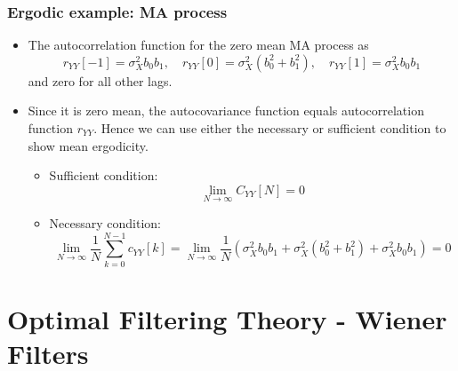\documentclass[12pt]{article}
\newcommand{\sigd}{\sigma^2}
\begin{document}
\subsubsection{Ergodic example: MA process}
\begin{itemize}
    \item The autocorrelation function for the zero mean MA process as 
    \[
    r_{YY}[-1] = \sigd_X b_0 b_1,\quad r_{YY}[0] =\sigd_X (b_0^2 + b_1^2), \quad r_{YY}[1] = \sigd_X b_0 b_1
    \]
    and zero for all other lags.
    \item Since it is zero mean, the autocovariance function equals autocorrelation function $r_{YY}$. Hence we can use either the necessary or sufficient condition to show mean ergodicity.
    \begin{itemize}
        \item Sufficient condition:
        \[
        \lim_{N\rightarrow \infty}C_{YY}[N] = 0
        \]
        \item Necessary condition:
        \[
        \lim_{N\rightarrow \infty}  \frac{1}{N} \sum_{k=0}^{N-1}c_{YY}[k] = \lim_{N\rightarrow \infty}  \frac{1}{N}(\sigd_Xb_0 b_1 + \sigd_X(b_0^2 + b_1^2) + \sigd_X b_0 b_1) = 0
        \]
    \end{itemize}
    
\end{itemize}
\section{Optimal Filtering Theory - Wiener Filters}
\end{document}
